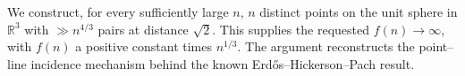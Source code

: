 We construct, for every sufficiently large $n$, $n$ distinct points on the unit sphere in $\mathbb R^3$ with $\gg n^{4/3}$ pairs at distance $\sqrt2$. This supplies the requested $f(n)\to\infty$, with $f(n)$ a positive constant times $n^{1/3}$. The argument reconstructs the point--line incidence mechanism behind the known Erd\H{o}s--Hickerson--Pach result.

